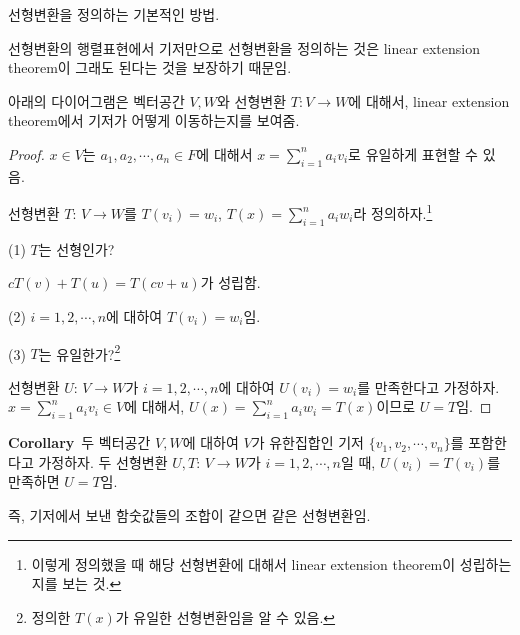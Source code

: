 선형변환을 정의하는 기본적인 방법.

선형변환의 행렬표현에서 기저만으로 선형변환을 정의하는 것은 linear extension theorem이 그래도 된다는 것을 보장하기 때문임.

아래의 다이어그램은 벡터공간 $V,W$와 선형변환 $T:V \rightarrow W$에 대해서, linear extension theorem에서 기저가 어떻게 이동하는지를 보여줌.


\begin{proof}
$x \in V$는 $a_1,a_2, \cdots ,a_n \in F$에 대해서 $x=\sum_{i=1}^{n}{a_{i}v_{i}}$로 유일하게 표현할 수 있음.

선형변환 $T:\,V \rightarrow W$를 $T(v_i)=w_i$, $T(x)=\sum_{i=1}^{n}{a_{i}w_{i}}$라 정의하자.\footnote{이렇게 정의했을 때 해당 선형변환에 대해서 linear extension theorem이 성립하는지를 보는 것.}

(1) $T$는 선형인가?

$cT(v)+T(u)=T(cv+u)$가 성립함.

(2) $i=1,2, \cdots ,n$에 대하여 $T(v_i)=w_i$임.

(3) $T$는 유일한가?\footnote{정의한 $T(x)$가 유일한 선형변환임을 알 수 있음.}

선형변환 $U:\,V \rightarrow W$가 $i=1,2, \cdots ,n$에 대하여 $U(v_i)=w_i$를 만족한다고 가정하자. $x=\sum_{i=1}^{n}{a_{i}v_{i}} \in V$에 대해서, $U(x)=\sum_{i=1}^{n}{a_{i}w_{i}}=T(x)$이므로 $U=T$임.
\end{proof}

\textbf{Corollary}\, 두 벡터공간 $V,W$에 대하여 $V$가 유한집합인 기저 $\{v_1,v_2, \cdots ,v_n\}$를 포함한다고 가정하자. 두 선형변환 $U,T:\,V \rightarrow W$가 $i=1,2, \cdots ,n$일 때, $U(v_i)=T(v_i)$를 만족하면 $U=T$임.

즉, 기저에서 보낸 함숫값들의 조합이 같으면 같은 선형변환임.


